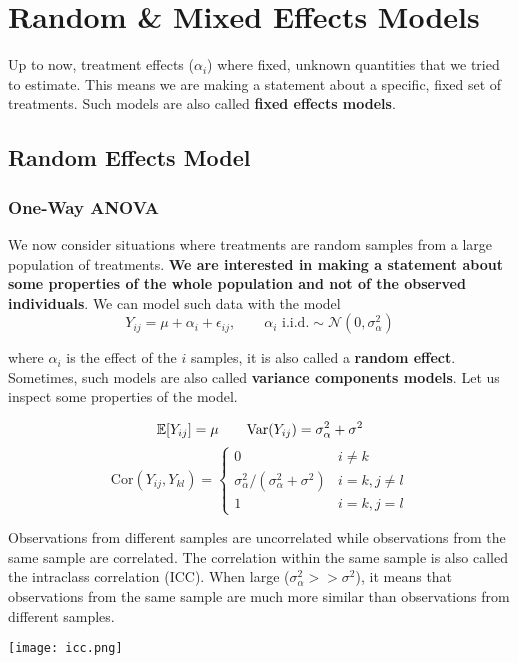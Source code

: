 \section{Random \& Mixed Effects Models}

Up to now, treatment effects ($\alpha_i$) where fixed, unknown quantities that we tried to estimate. This means we are making a statement about a specific, fixed set of treatments. Such models are also called \textbf{fixed effects models}.

\subsection{Random Effects Model}

\subsubsection{One-Way ANOVA}

We now consider situations where treatments are random samples from a large population of treatments. \textbf{We are interested in making a statement about some properties of the whole population and not of the observed individuals}. We can model such data with the model
$$Y_{ij} = \mu + \alpha_i + \epsilon_{ij}, \qquad \alpha_i \text{ i.i.d.} \sim \mathcal{N}(0, \sigma_\alpha^2)$$

where $\alpha_i$ is the effect of the $i$ samples, it is also called a \textbf{random effect}. Sometimes, such models are also called \textbf{variance components models}. Let us inspect some properties of the model.

$$\mathbb{E} [Y_{ij}] = \mu \qquad \text{Var}(Y_{ij}) = \sigma_\alpha^2 + \sigma^2$$
$$\text{Cor}(Y_{ij}, Y_{kl}) = \begin{cases}
	0 & i \neq k \\
	\sigma_\alpha^2 / (\sigma_\alpha^2 + \sigma^2) & i = k, j \neq l \\
	1 & i = k, j = l
\end{cases}$$

Observations from different samples are uncorrelated while observations from the same sample are correlated. The correlation within the same sample is also called the intraclass correlation (ICC). When large ($\sigma_\alpha^2 >> \sigma^2$), it means that observations from the same sample are much more similar than observations from different samples.

\begin{center}
	\texttt{[image: icc.png]}
\end{center}

